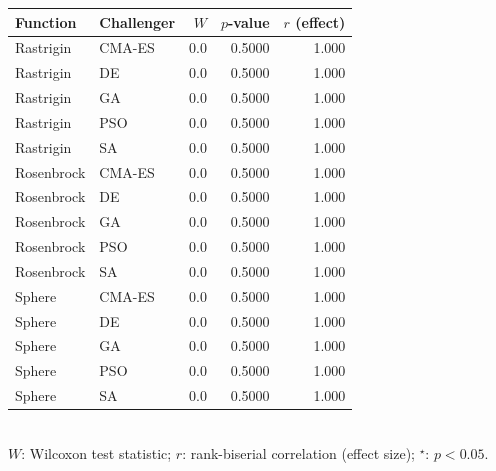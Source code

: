 \begin{table}[htb]
\medskip
\begin{tabular}{llrrr}
\toprule
Function & Challenger & $W$ & $p$-value & $r$ (effect) \\
\midrule
  Rastrigin & CMA-ES & 0.0 & 0.5000 & 1.000 \\
  Rastrigin & DE & 0.0 & 0.5000 & 1.000 \\
  Rastrigin & GA & 0.0 & 0.5000 & 1.000 \\
  Rastrigin & PSO & 0.0 & 0.5000 & 1.000 \\
  Rastrigin & SA & 0.0 & 0.5000 & 1.000 \\
  Rosenbrock & CMA-ES & 0.0 & 0.5000 & 1.000 \\
  Rosenbrock & DE & 0.0 & 0.5000 & 1.000 \\
  Rosenbrock & GA & 0.0 & 0.5000 & 1.000 \\
  Rosenbrock & PSO & 0.0 & 0.5000 & 1.000 \\
  Rosenbrock & SA & 0.0 & 0.5000 & 1.000 \\
  Sphere & CMA-ES & 0.0 & 0.5000 & 1.000 \\
  Sphere & DE & 0.0 & 0.5000 & 1.000 \\
  Sphere & GA & 0.0 & 0.5000 & 1.000 \\
  Sphere & PSO & 0.0 & 0.5000 & 1.000 \\
  Sphere & SA & 0.0 & 0.5000 & 1.000 \\
\bottomrule
\end{tabular}
\\ \footnotesize{$W$: Wilcoxon test statistic; $r$: rank-biserial correlation (effect size); $^\star$: $p < 0.05$.}
\end{table}